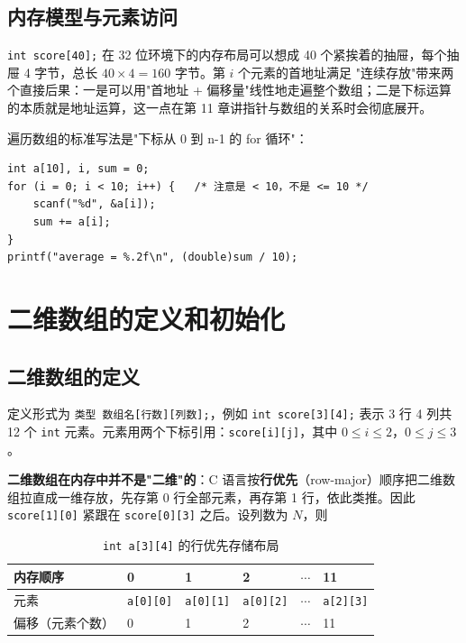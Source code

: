 
\subsection{内存模型与元素访问}
\texttt{int score[40];} 在 32 位环境下的内存布局可以想成 40 个紧挨着的抽屉，每个抽屉 4 字节，总长 $40\times4=160$ 字节。第 $i$ 个元素的首地址满足
"连续存放"带来两个直接后果：一是可以用"首地址 + 偏移量"线性地走遍整个数组；二是下标运算的本质就是地址运算，这一点在第 11 章讲指针与数组的关系时会彻底展开。

遍历数组的标准写法是"下标从 0 到 n-1 的 for 循环"：
\begin{lstlisting}
int a[10], i, sum = 0;
for (i = 0; i < 10; i++) {   /* 注意是 < 10，不是 <= 10 */
    scanf("%d", &a[i]);
    sum += a[i];
}
printf("average = %.2f\n", (double)sum / 10);
\end{lstlisting}

\section{二维数组的定义和初始化}
\subsection{二维数组的定义}
定义形式为 \texttt{类型 数组名[行数][列数];}，例如 \texttt{int score[3][4];} 表示 3 行 4 列共 12 个 \texttt{int} 元素。元素用两个下标引用：\texttt{score[i][j]}，其中 $0\le i\le2$，$0\le j\le3$。

\textbf{二维数组在内存中并不是"二维"的}：C 语言按\textbf{行优先}（row-major）顺序把二维数组拉直成一维存放，先存第 0 行全部元素，再存第 1 行，依此类推。因此 \texttt{score[1][0]} 紧跟在 \texttt{score[0][3]} 之后。设列数为 $N$，则

\begin{table}[htbp]
\centering
\caption{\texttt{int a[3][4]} 的行优先存储布局}
\footnotesize
\begin{tabular}{@{}llllll@{}}
\toprule
内存顺序 & 0 & 1 & 2 & $\cdots$ & 11 \\
\midrule
元素 & \texttt{a[0][0]} & \texttt{a[0][1]} & \texttt{a[0][2]} & $\cdots$ & \texttt{a[2][3]} \\
偏移（元素个数） & 0 & 1 & 2 & $\cdots$ & 11 \\
\bottomrule
\end{tabular}
\end{table}

